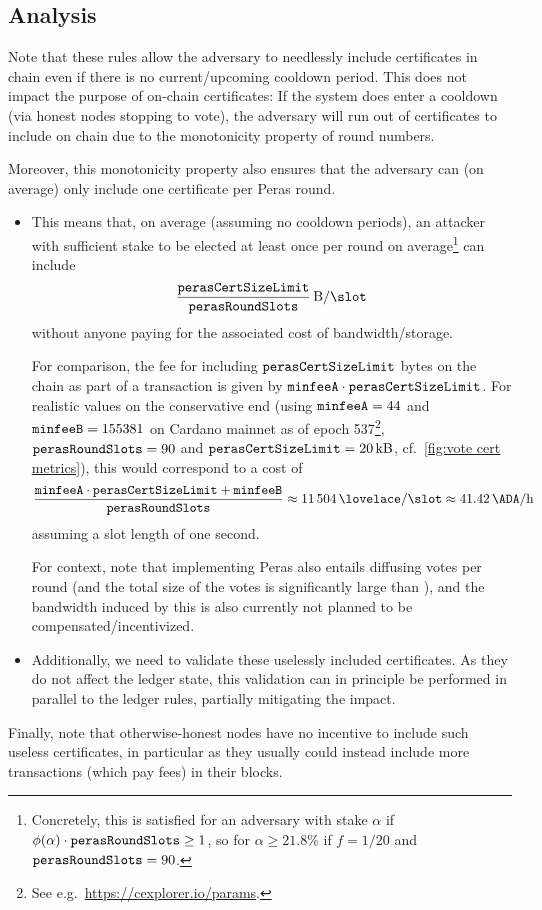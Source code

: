 \subsection{Analysis}
Note that these rules allow the adversary to needlessly include certificates in chain even if there is no current/upcoming cooldown period.
This does not impact the purpose of on-chain certificates:
If the system does enter a cooldown (via honest nodes stopping to vote), the adversary will run out of certificates to include on chain due to the monotonicity property of round numbers.

Moreover, this monotonicity property also ensures that the adversary can (on average) only include one certificate per Peras round.
\begin{itemize}
\item
  This means that, on average (assuming no cooldown periods), an attacker with sufficient stake to be elected at least once per round on average\footnote{Concretely, this is satisfied for an adversary with stake $\alpha$ if $\phi(\alpha)\cdot\mathtt{perasRoundSlots} \ge 1$, so for $\alpha \ge 21.8\%$ if $f=1/20$ and $\mathtt{perasRoundSlots}=90$.} can include
  \[\frac \perasCertSizeLimit \perasRoundSlots\,\unit{B/\slot}\]
  without anyone paying for the associated cost of bandwidth/storage.

  For comparison, the fee for including $\mathtt{perasCertSizeLimit}$ bytes on the chain as part of a transaction is given by $\mathtt{minfeeA}\cdot \mathtt{perasCertSizeLimit}$.
  For realistic values on the conservative end (using $\mathtt{minfeeA} = 44$ and $\mathtt{minfeeB} = 155381$ on Cardano mainnet as of epoch 537\footnote{See e.g.\ \url{https://cexplorer.io/params}.}, $\mathtt{perasRoundSlots}=90$ and $\mathtt{perasCertSizeLimit} = \SI{20}{kB}$, cf.~\cref{fig:vote cert metrics}), this would correspond to a cost of
  \[ \frac{\mi{minfeeA\cdot \perasCertSizeLimit + \mi{minfeeB}}}{\perasRoundSlots} \approx \SI{11504}{\lovelace/\slot} \approx \SI{41.42}{\ADA/h} \]
  assuming a slot length of one second.

  For context, note that implementing Peras also entails diffusing \perasN{} votes per round (and the total size of the votes is significantly large than \perasCertSizeLimit{}), and the bandwidth induced by this is also currently not planned to be compensated/incentivized.
\item
  Additionally, we need to validate these uselessly included certificates.
  As they do not affect the ledger state, this validation can in principle be performed in parallel to the ledger rules, partially mitigating the impact.
\end{itemize}
Finally, note that otherwise-honest nodes have no incentive to include such useless certificates, in particular as they usually could instead include more transactions (which pay fees) in their blocks.


